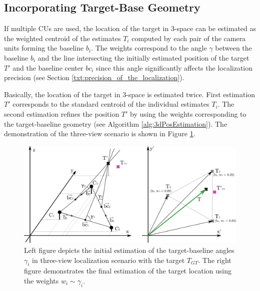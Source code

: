 \subsection{Incorporating Target-Base Geometry} \label{txt:incorporating_target-base_geometry}

If multiple CUs are used, the location of the target in 3-space can be estimated as the weighted centroid of the estimates $T_{i}$ computed by each pair of the camera units forming the baseline $b_{i}$. The weights correspond to the angle $\gamma$ between the baseline $b_{i}$ and the line intersecting the initially estimated position of the target $T'$ and the baseline center $bc_{i}$ since this angle significantly affects the localization precision (see Section \ref{txt:precision_of_the_localization}).

Basically, the location of the target in 3-space is estimated twice. First estimation $T'$ corresponds to the standard centroid of the individual estimates $T_{i}$. The second estimation refines the position $T'$ by using the weights corresponding to the target-baseline geometry (see Algorithm \ref{alg:3dPosEstimation}). The demonstration of the three-view scenario is shown in Figure \ref{fig:target-base_and_weighted_centroid}.

\begin{figure}[htb]\centering
	\centering
	\includegraphics[width=0.8\linewidth]{fig/target-base_and_weighted_centroid.pdf}
	\caption{Left figure depicts the initial estimation of the target-baseline angles $\gamma_{i}$ in three-view localization scenario with the target $T_{GT}$. The right figure demonstrates the final estimation of the target location using the weights $w_{i} \sim \gamma_{i}$.}
	\label{fig:target-base_and_weighted_centroid}
\end{figure}

